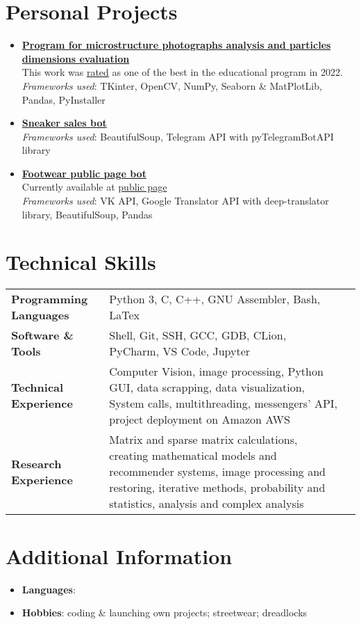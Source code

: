 \documentclass[11pt, a4paper]{article}
\begin{document}
\section*{Personal Projects}
\begin{itemize}
    \item \href{https://github.com/wwwwwert/structure_editor}
    {\textbf{Program for microstructure photographs analysis and particles dimensions evaluation}} \\
    This work was \href{https://cs.hse.ru/cppr/best_projects}{rated} as one of the best in the educational program in 2022. \\
    {\footnotesize \textit{Frameworks used}: TKinter, OpenCV, NumPy, Seaborn \& MatPlotLib, Pandas, PyInstaller}

    \item \href{https://github.com/wwwwwert/sneaker_sales_bot}{\textbf{Sneaker sales bot}} \\
    {\footnotesize \textit{Frameworks used}: BeautifulSoup, Telegram API with pyTelegramBotAPI library}

    \item \href{https://github.com/wwwwwert/footwear_page_bot}{\textbf{Footwear public page bot}} \\
    Currently available at \href{https://vk.com/footwear_damn}{public page} \\
    {\footnotesize \textit{Frameworks used}: VK API, Google Translator API with deep-translator library, BeautifulSoup, Pandas}

\end{itemize}

\section*{Technical Skills}
\begin{tabular}{ l p{12cm}l }
    \textbf{Programming Languages} & Python 3, C, C++, GNU Assembler, Bash, LaTex \\ [0.8ex]
    \textbf{Software \& Tools} & Shell, Git, SSH, GCC, GDB, CLion, PyCharm, VS Code, Jupyter \\ [0.8ex]
    \textbf{Technical Experience} & Computer Vision, image processing, Python GUI, 
    data scrapping, data visualization, System calls, multithreading, messengers' API, 
    project deployment on Amazon AWS \\ [0.8ex]
    \textbf{Research Experience} & Matrix and sparse matrix calculations, creating mathematical models and recommender systems, 
    image processing and restoring, iterative methods, probability and statistics, analysis and complex analysis
\end{tabular}

\section*{Additional Information}
\begin{itemize}
\item \textbf{Languages}: 
\item \textbf{Hobbies}: coding \& launching own projects; streetwear; dreadlocks
\end{itemize}
\end{document}
